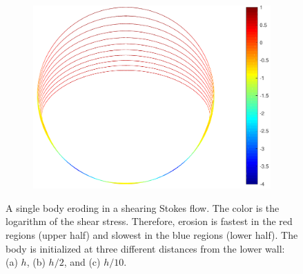 \documentclass{jfm}
\begin{document}
\begin{figure}
\begin{center}
\begin{subfigure}[b]{0.32\textwidth}
\includegraphics[height = 0.74\textwidth]{./figs/1b_0d4r0d1h_shear}
\caption{}
\end{subfigure}
\end{center}
\caption{\label{fig:NearWall} A single body eroding in a shearing Stokes
flow.  The color is the logarithm of the shear stress. Therefore,
erosion is fastest in the red regions (upper half) and slowest in the
blue regions (lower half).  The body is initialized at three different
distances from the lower wall: (a) $h$, (b) $h/2$, and (c) $h/10$.}
\end{figure}
\end{document}
